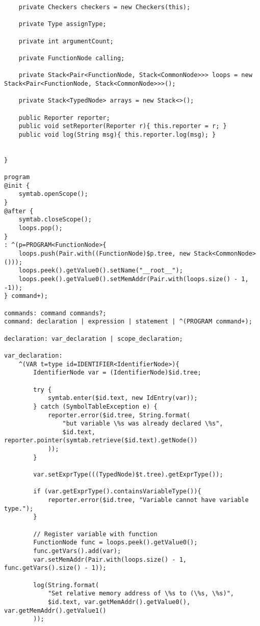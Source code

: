 \begin{landscape}
\begin{lstlisting}
    private Checkers checkers = new Checkers(this);

    private Type assignType;

    private int argumentCount;

    private FunctionNode calling;

    private Stack<Pair<FunctionNode, Stack<CommonNode>>> loops = new Stack<Pair<FunctionNode, Stack<CommonNode>>>();

    private Stack<TypedNode> arrays = new Stack<>();

    public Reporter reporter;
    public void setReporter(Reporter r){ this.reporter = r; }
    public void log(String msg){ this.reporter.log(msg); }


}

program
@init {
    symtab.openScope();
}
@after {
    symtab.closeScope();
    loops.pop();
}
: ^(p=PROGRAM<FunctionNode>{
    loops.push(Pair.with((FunctionNode)$p.tree, new Stack<CommonNode>()));
    loops.peek().getValue0().setName("__root__");
    loops.peek().getValue0().setMemAddr(Pair.with(loops.size() - 1, -1));
} command+);

commands: command commands?;
command: declaration | expression | statement | ^(PROGRAM command+);

declaration: var_declaration | scope_declaration;

var_declaration:
    ^(VAR t=type id=IDENTIFIER<IdentifierNode>){
        IdentifierNode var = (IdentifierNode)$id.tree;

        try {
            symtab.enter($id.text, new IdEntry(var));
        } catch (SymbolTableException e) {
            reporter.error($id.tree, String.format(
                "but variable \%s was already declared \%s",
                $id.text, reporter.pointer(symtab.retrieve($id.text).getNode())
            ));
        }

        var.setExprType(((TypedNode)$t.tree).getExprType());

        if (var.getExprType().containsVariableType()){
            reporter.error($id.tree, "Variable cannot have variable type.");
        }

        // Register variable with function
        FunctionNode func = loops.peek().getValue0();
        func.getVars().add(var);
        var.setMemAddr(Pair.with(loops.size() - 1, func.getVars().size() - 1));

        log(String.format(
            "Set relative memory address of \%s to (\%s, \%s)",
            $id.text, var.getMemAddr().getValue0(), var.getMemAddr().getValue1()
        ));


\end{lstlisting}
\end{landscape}
